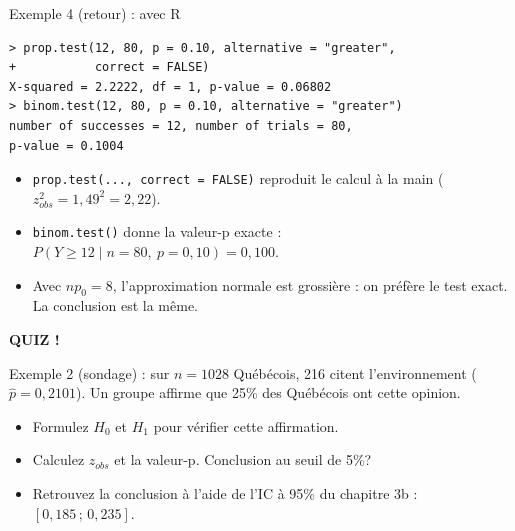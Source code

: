 \documentclass{BeamerTemplate}
\begin{document}
\begin{frame}[fragile,t]{Exemple 4 (retour) : avec R}
  \footnotesize
\begin{verbatim}
> prop.test(12, 80, p = 0.10, alternative = "greater",
+           correct = FALSE)
X-squared = 2.2222, df = 1, p-value = 0.06802
> binom.test(12, 80, p = 0.10, alternative = "greater")
number of successes = 12, number of trials = 80,
p-value = 0.1004
\end{verbatim}

  \small
  \begin{itemize}\itemsep 2mm
    \item \texttt{prop.test(..., correct = FALSE)} reproduit le calcul à la main ($z_{obs}^2 = 1{,}49^2 = 2{,}22$).
    \item \texttt{binom.test()} donne la valeur-p \alert{exacte} : $P(Y \ge 12 \mid n = 80,\ p = 0{,}10) = 0{,}100$.
    \item Avec $np_0 = 8$, l'approximation normale est grossière : on préfère le test exact. La conclusion est la même.
  \end{itemize}
\end{frame}

\begin{frame}[plain,t]
  \centerline{\LARGE\bfseries\alert{QUIZ !}}

  \medskip
  Exemple 2 (sondage) : sur $n = 1028$ Québécois, 216 citent l'environnement ($\hat{p} = 0{,}2101$). Un groupe affirme que \alert{25\%} des Québécois ont cette opinion.
  \begin{itemize}\itemsep 1.1cm
    \item Formulez $H_0$ et $H_1$ pour vérifier cette affirmation.
    \item<2-> Calculez $z_{obs}$ et la valeur-p. Conclusion au seuil de 5\%?
    \item<3-> Retrouvez la conclusion à l'aide de l'IC à 95\% du chapitre 3b : $[0{,}185 \,;\, 0{,}235]$.
  \end{itemize}
\end{frame}
\end{document}
